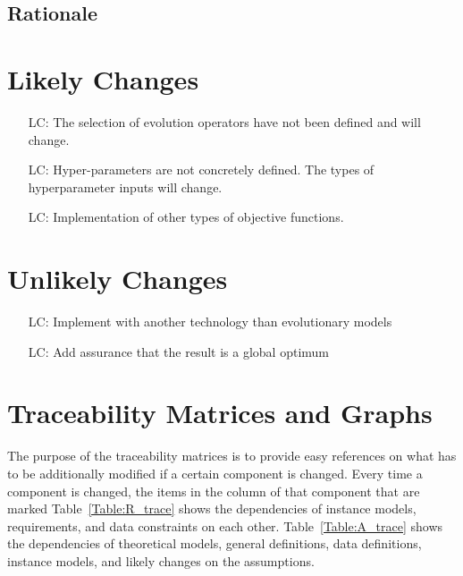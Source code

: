 \documentclass[12pt]{article}
\newcounter{lcnum} %
\begin{document}
\subsection{Rationale}
\label{subsubsec:rationale}


\section{Likely Changes}
\label{sec:lchanges}

\noindent \begin{itemize}

\item[LC\refstepcounter{lcnum}\thelcnum\label{LC_EVOP}:] The selection of evolution operators have not been defined and will change.
\item[LC\refstepcounter{lcnum}\thelcnum\label{LC_HYPER}:] Hyper-parameters are not concretely defined. The types of hyperparameter inputs will change.
\item[LC\refstepcounter{lcnum}\thelcnum\label{LC_OBJC}:] Implementation of other types of objective functions.

\end{itemize}

\section{Unlikely Changes}   
\label{sec:uchanges} 

\noindent \begin{itemize}

\item[LC\refstepcounter{lcnum}\thelcnum\label{ULC_TECHNOLOGY}:] Implement \thisproject with another technology than evolutionary models

\item[LC\refstepcounter{lcnum}\thelcnum\label{ULC_FINDOPTIMUM}:] Add assurance that the result is a global optimum

\end{itemize}

\section{Traceability Matrices and Graphs}
\label{sec:tracer}

The purpose of the traceability matrices is to provide easy references on what
has to be additionally modified if a certain component is changed.  Every time a
component is changed, the items in the column of that component that are marked
Table~\ref{Table:R_trace} shows the
dependencies of instance models, requirements, and data constraints on each
other. Table~\ref{Table:A_trace} shows the dependencies of theoretical models,
general definitions, data definitions, instance models, and likely changes on
the assumptions.
\end{document}
